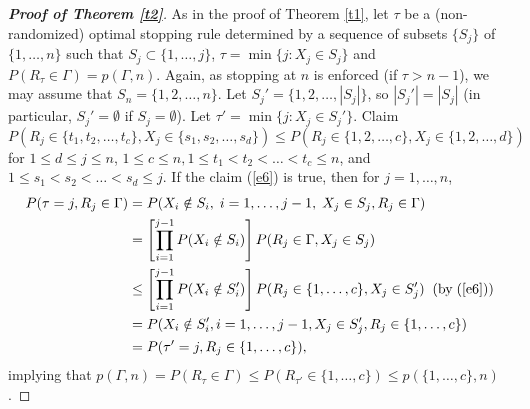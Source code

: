 \documentclass[12pt, A4paper, oneside]{article}
\theoremstyle{plain}
\numberwithin{equation}{section}
\begin{document}
\begin{proof}[\bf Proof of Theorem \ref{t2}]
As in  the proof of Theorem \ref{t1}, let $\tau$ be a (non-randomized) optimal stopping rule determined by a sequence of
subsets $\{S_j\}$ of $\{1,\dots,n\}$ such that $S_j \subset \{1,\dots,j\}$, $\tau=\min\{j:X_j \in S_j\}$ and $P(R_{\tau} \in \Gamma)=p(\Gamma,n)$.
Again, as stopping at $n$ is enforced (if $\tau>n-1$), we may assume that $S_n=\{1,2,\dots,n\}$.
Let $S_j'=\{1,2,\dots, |S_j|\}$, so $|S_j'|=|S_j|$ (in particular, $S_j'=\emptyset$ if $S_j=\emptyset$). Let $\tau'=\min\{j: X_j \in S_j'\}$.
Claim
\begin{equation}\label{e6}
P(R_j\in\{t_1,t_2,\dots,t_c\},X_j\in\{s_1,s_2,\dots,s_d\})\le P(R_j\in\{1,2,\dots,c\},X_j\in\{1,2,\dots,d\})
\end{equation}
for $1\le d \le j\le n$, $1\le c\le n, 1\le t_1<t_2<\dots<t_c\le n$, and $1\le s_1<s_2<\dots<s_d\le j$.
If the claim (\ref{e6}) is true, then for $j=1,\dots,n$,
\begin{align}
P(\tau=j,R_j\in \Gamma)&=P(X_i\notin S_i,\;i=1,\dots,j-1,\;X_j\in S_j,R_j\in \Gamma)\notag\\
&=\left[\prod_{i=1}^{j-1}P(X_i\notin S_i)\right]  P(R_j \in \Gamma, X_j\in S_j)\notag\\
&\le\left[\prod_{i=1}^{j-1}P(X_i\notin S_i')\right] P(R_j \in \{1,\dots,c\}, X_j\in S_j')\;\;(\mbox{by}\;(\ref{e6}))\notag\\
&=P(X_i\notin S_i', i=1,\dots, j-1, X_j \in S_j', R_j \in \{1,\dots,c\})\notag\\
&=P(\tau'=j,R_j\in \{1,\dots,c\})\notag,
\end{align}
implying that $p(\Gamma,n)=P(R_\tau \in \Gamma)\le  P(R_{\tau'}\in \{1,\dots,c\})\le p(\{1,\dots,c\},n)$.


\end{proof}
\end{document}
